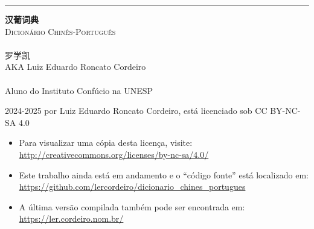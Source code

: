 
\begin{titlingpage}
  \raggedleft
  \rule{1pt}{\textheight}
  \hspace{0.1\textwidth}
  \parbox[b]{0.75\textwidth}{
    \vspace{0.05\textheight}
    {\HUGE\bfseries 汉葡词典}\\[2\baselineskip] %
    {\Large\textsc{Dicionário Chinês-Português}\\%
     \large\textsc{\zhtoday}}\\%
    [4\baselineskip]
    {\Large\textsc{罗学凯}\\%
     \small AKA Luiz Eduardo Roncato Cordeiro}\\%
    \vspace{0.5\textheight}\\%
    {Aluno do Instituto Confúcio na UNESP}\\[\baselineskip] %
  }
  \newpage
  \raggedright
  \setlength{\parindent}{0pt}
  \setlength{\parskip}{\baselineskip}
  \mbox{}
  \vfill
  \footnotesize
  \textcopyright{} 2024-2025 por Luiz Eduardo Roncato Cordeiro, está licenciado sob CC BY-NC-SA 4.0\\
  \begin{itemize}
    \item Para visualizar uma cópia desta licença, visite:\\ \url{http://creativecommons.org/licenses/by-nc-sa/4.0/}
    \item Este trabalho ainda está em andamento e o ``código fonte'' está localizado em:\\ \url{https://github.com/lercordeiro/dicionario_chines_portugues}
    \item A última versão compilada também pode ser encontrada em:\\ \url{https://ler.cordeiro.nom.br/}
  \end{itemize}
\end{titlingpage}

